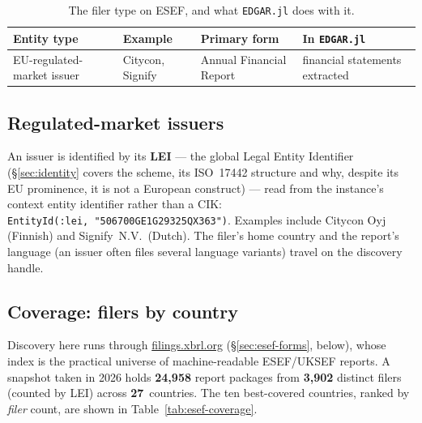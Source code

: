 \documentclass[11pt,a4paper]{report}
\begin{document}
\begin{table}[h]
\centering
\small
\caption{The filer type on ESEF, and what \texttt{EDGAR.jl} does with it.}
\label{tab:esef-entities}
\begin{tabular}{@{}p{}p{}p{}p{}@{}}
\toprule
\textbf{Entity type} & \textbf{Example} & \textbf{Primary form} & \textbf{In \texttt{EDGAR.jl}} \\
\midrule
EU-regulated-market issuer & Citycon, Signify & Annual Financial Report & financial statements extracted \\
\bottomrule
\end{tabular}
\end{table}

\subsection{Regulated-market issuers}
An issuer is identified by its \textbf{LEI} --- the global Legal Entity Identifier (\S\ref{sec:identity} covers
the scheme, its ISO~17442 structure and why, despite its EU prominence, it is not a European construct) --- read
from the instance's context entity identifier rather than a CIK: \texttt{EntityId(:lei,\
"506700GE1G29325QX363")}. Examples include Citycon Oyj (Finnish) and Signify~N.V.\ (Dutch). The filer's home
country and the report's language (an issuer often files several language variants) travel on the discovery
handle.

\subsection{Coverage: filers by country}
\label{sec:esef-coverage}
Discovery here runs through \href{https://filings.xbrl.org}{filings.xbrl.org} (\S\ref{sec:esef-forms}, below),
whose index is the practical universe of machine-readable ESEF/UKSEF reports. A snapshot taken in 2026 holds
\textbf{24{,}958} report packages from \textbf{3{,}902} distinct filers (counted by LEI) across
\textbf{27}~countries. The ten best-covered countries, ranked by \emph{filer} count, are shown in
Table~\ref{tab:esef-coverage}.
\end{document}
